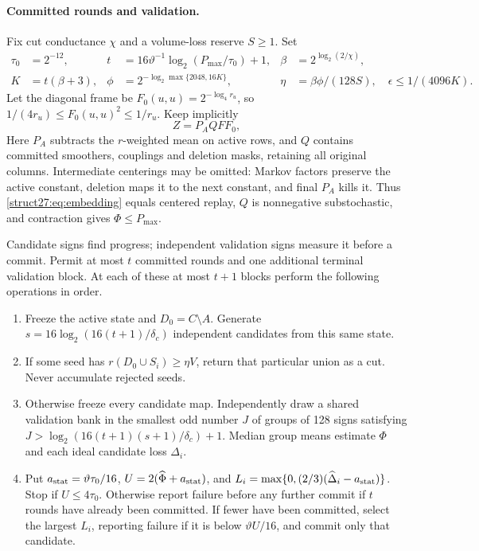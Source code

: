 \documentclass[11pt]{article}
\theoremstyle{remark}
\begin{document}
\paragraph{Committed rounds and validation.}
Fix cut conductance $\chi$ and a volume-loss reserve $S\ge1$.
Set
\begin{align}
 \tau_0&=2^{-12},&
 t&= 16\vartheta^{-1} \log_2(P_{\max}/\tau_0)  +1,
 &\beta&=2^{ \log_2(2/\chi) },\label{struct27:eq:gameparam1}\\
 K&=t(\beta+3),&
 \phi&=2^{- \log_2\max\{2048,16K\} },
 &\eta&=\beta\phi/(128S),\quad \epsilon\le1/(4096K).
 \label{struct27:eq:gameparam2}
\end{align}
Let the diagonal frame be $F_0(u,u)=2^{- \log_4r_u }$, so
$1/(4r_u)\le F_0(u,u)^2\le1/r_u$.
Keep implicitly
\begin{equation}\label{struct27:eq:embedding}
 Z=P_AQFF_0,
\end{equation}
Here $P_A$ subtracts the $r$-weighted mean on active rows, and $Q$ contains
committed smoothers, couplings and deletion masks, retaining all original
columns.
Intermediate centerings may be omitted: Markov factors preserve the active
constant, deletion maps it to the next constant, and final $P_A$ kills it.
Thus \eqref{struct27:eq:embedding} equals centered replay, $Q$ is nonnegative
substochastic, and contraction gives $\Phi\le P_{\max}$.

Candidate signs find progress; independent validation signs measure
it before a commit.  Permit at most $t$ committed rounds and one
additional terminal validation block.  At each of these at most $t+1$
blocks perform the following operations in order.
\begin{enumerate}[leftmargin=*]
\item Freeze the active state and $D_0=C\setminus A$.  Generate
$s=16 \log_2(16(t+1)/\delta_c) $ independent candidates from
this same state.
\item If some seed has $r(D_0\cup S_i)\ge\eta V$, return that
particular union as a cut.  Never accumulate rejected seeds.
\item Otherwise freeze every candidate map.  Independently draw a
shared validation bank in the smallest odd number $J$ of groups of
128 signs satisfying $J>\log_2(16(t+1)(s+1)/\delta_c)+1$.
Median group means estimate
$\Phi$ and each ideal candidate loss $\Delta_i$.
\item Put $a_{\rm stat}=\vartheta\tau_0/16$,
$U=2(\widehat\Phi+a_{\rm stat})$, and
$L_i=\max\{0,(2/3)(\widehat\Delta_i-a_{\rm stat})\}$.
Stop if $U\le4\tau_0$.  Otherwise report failure before any further
commit if $t$ rounds have already been committed.  If fewer have
been committed, select the largest $L_i$, reporting failure if it
is below $\vartheta U/16$, and commit only that candidate.
\end{enumerate}
\end{document}
